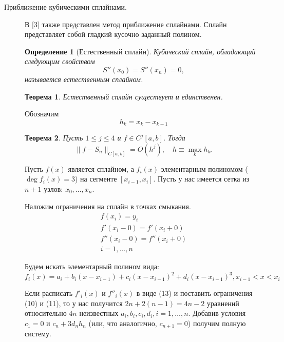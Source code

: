 \documentclass{article}
\newtheorem{theorem}{Теорема}
\newtheorem{definition}{Определение}[section]
\begin{document}
\begin{description}
    \item[Приближение кубическими сплайнами.]

    В [3] также представлен метод приближение сплайнами. Сплайн представляет собой гладкий кусочно заданный полином.
    \begin{definition}[Естественный сплайн]
        Кубический сплайн, обладающий следующим свойством
        \begin{equation}
            S''(x_0) = S''(x_n) = 0,
            \label{eq:placeholder_label}
        \end{equation}
        называется естественным сплайном.
    \end{definition}    

    \begin{theorem}
        Естественный сплайн существует и единственен.
    \end{theorem}

    Обозначим
    \begin{equation}
        h_k = x_k - x_{k-1}
    \end{equation}

    \begin{theorem}
        Пусть \(1 \leq j \leq 4\) и \(f \in C^j[a, b]\). Тогда
        \begin{equation}
            \|f - S_n\|_{C[a, b]} = O(h^j), \quad h \equiv \max_k h_k.
            \label{eq:example}
        \end{equation}
    \end{theorem}
    
    Пусть \(f(x)\) является сплайном, а \(f_i(x)\) элементарным полиномом (\(\deg f_i(x) = 3\)) на сегменте \([x_{i-1}, x_i]\). Пусть у нас имеется сетка из \(n+1\) узлов: \(x_0,\dots,x_n\).
    
    Наложим ограничения на сплайн в точках смыкания.
    \begin{align}
    	f(x_i) = y_i \\
    	f'(x_i-0) = f'(x_i+0) \\
    	f''(x_i-0) = f''(x_i+0) \\
    	i = 1,\dots,n
    \end{align}
    
    Будем искать элементарный полином вида:
    \begin{equation}
    	f_i(x) = a_i + b_i(x - x_{i-1}) + c_i(x - x_{i-1})^2 + d_i(x - x_{i-1})^3, x_{i-1} < x < x_i
    \end{equation}
    
    Если расписать \(f'_i(x)\) и \(f''_i(x)\) в виде (13) и поставить ограничения (10) и (11), то у нас получится \(2n + 2(n-1) = 4n-2\) уравнений относительно \(4n\) неизвестных 
    \(a_i,b_i,c_i,d_i, i = 1,\dots,n\). Добавив условия \(c_1 = 0\) и \(c_n + 3 d_n h_n\) (или, что аналогично, \(c_{n+1} = 0\)) получим полную систему.
    

\end{description}
\end{document}
